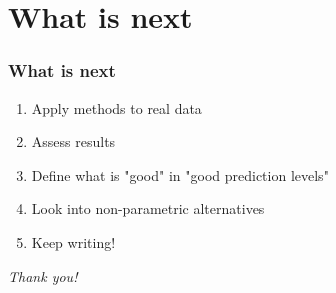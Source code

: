 \documentclass{beamer}
\begin{document}
\section{What is next}
\begin{frame}
	\frametitle{What is next}
	\pause
	\begin{enumerate}
		\item Apply methods to real data
		\pause
		\item Assess results
		\pause
		\item Define what is  "good" in "good prediction levels"
		\pause
		\item Look into non-parametric alternatives
		\pause
		\item Keep writing!
	\end{enumerate}
\end{frame}

\begin{frame}{}
	\centering \Huge
	\emph{Thank you!}
\end{frame}
\end{document}
